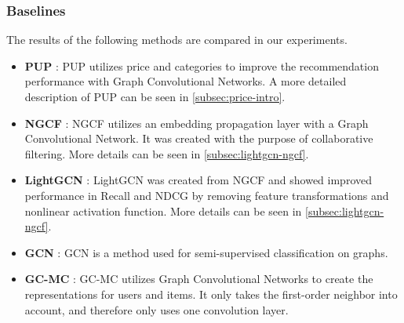\subsubsection{Baselines}
The results of the following methods are compared in our experiments.
\begin{itemize}
    \item \textbf{PUP} \cite{Priceaware}: PUP utilizes price and categories to improve the recommendation performance with Graph Convolutional Networks. A more detailed description of PUP can be seen in \autoref{subsec:price-intro}.
    \item \textbf{NGCF} \cite{NGCF_2019}: NGCF utilizes an embedding propagation layer with a Graph Convolutional Network. It was created with the purpose of collaborative filtering. More details can be seen in \autoref{subsec:lightgcn-ngcf}.
    \item \textbf{LightGCN} \cite{lightgcn}: LightGCN was created from NGCF and showed improved performance in Recall and NDCG by removing feature transformations and nonlinear activation function. More details can be seen in \autoref{subsec:lightgcn-ngcf}.
    \item \textbf{GCN} \cite{kipf2017semisupervised}: GCN is a method used for semi-supervised classification on graphs.
    \item \textbf{GC-MC} \cite{berg2017graph}: GC-MC utilizes Graph Convolutional Networks to create the representations for users and items. It only takes the first-order neighbor into account, and therefore only uses one convolution layer.
\end{itemize}
